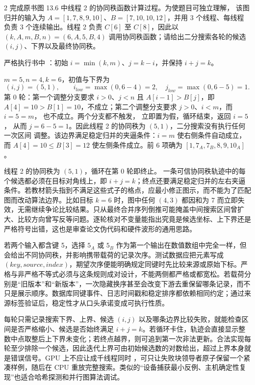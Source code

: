\begin{solutionexercise}{2}
\problemheading 完成原书图 13.6 中线程 2 的协同秩函数计算过程。为使题目可独立理解，
该图归并的输入为 $A=[1,7,8,9,10]$、$B=[7,10,10,12]$，并用 3 个线程、每线程
负责 3 个连续输出。线程 2 负责 $C[6]$ 至 $C[8]$，因此以
$(k,A,m,B,n)=(6,A,5,B,4)$ 调用协同秩函数；请给出二分搜索各轮的候选
$(i,j)$、下界以及最终协同秩。

\approachheading 严格执行书中 ：初始
$i=\min(k,m)$、$j=k-i$，并保持 $i+j=k$。

\answerheading $m=5,n=4,k=6$，初值与下界为
\[
(i,j)=(5,1),\qquad i_{low}=\max(0,6-4)=2,\quad
j_{low}=\max(0,6-5)=1.
\]
第 0 轮：第一个调整分支要求 $i>0$、$j<n$ 且 $A[i-1]>B[j]$，即
$A[4]=10>B[1]=10$，不成立；第二个调整分支要求 $j>0$、$i<m$，而 $i=5=m$，
也不成立。两个分支都不触发， 立即置为假，循环结束，返回 $i=5$，
从而 $j=6-5=1$。因此线程 2 的协同秩为 $(5,1)$，二分搜索没有执行任何一次区间
调整。该边界满足稳定归并的夹逼条件：$i=m$ 使右侧条件自动成立，而
$A[4]=10\le B[3]=12$ 使左侧条件成立。前 6 项确为 $[1,7_A,7_B,8,9,10_A]$。

\conclusionheading 线程 2 的协同秩为 $\boxed{(5,1)}$，循环在第 0 轮即终止。
\discussionheading
{}一条可信协同秩轨迹中的每个候选都必须在目标对角线上，即 $i+j=k$；终点还要满足稳定归并的左右夹逼条件。若教材箭头指到不满足这些式子的格点，应最小修正图示，而不能为了匹配图而改动算法边界。比如目标 $k=6$ 时，图中任何 $(4,3)$ 都因和为 7 而立即失效，无需继续争论比较结果。只从最终合并序列倒推可能掩盖中间搜索区间曾扩大、比较方向曾写反等问题。逐轮核对不变量能指出究竟是候选坐标、上下界还是严格符号出错，这也是审查论文伪代码和硬件波形的通用思路。

若两个输入都含键 5，选择 $5_A$ 或 $5_B$ 作为第一个输出在数值数组中完全一样，但会给出不同协同秩，并影响携带载荷的记录次序。测试数据应把元素写成 $(key,source,index)$，期望次序便能明确规定同键时先比较来源或原始下标。严格与非严格不等式必须与这条规则成对设计，不能两侧都严格或都宽松。若载荷分别是“旧版本”和“新版本”，一次隐藏换序甚至会改变下游去重保留哪条记录，而不只是展示顺序。数据库同键事件、日志时间戳和稳定排序都依赖相同约定；通过来源标签验证后，稳定性才从口头承诺变成可执行性质。

每轮只需记录搜索下界、上界、候选 $(i,j)$ 以及哪条边界比较失败，就能检查区间是否严格缩小、候选是否始终满足 $i+j=k$。若循环卡住，轨迹会直接显示整数中点取整后上下界未变化；若终点越界，则可追到第一次非法更新。合法实现每轮至少排除一个候选，因此迭代上界可由初始候选数的对数给出，超过上界本身就是错误信号。GPU 上不应让成千线程同时 ，可只让失败块领导者原子保留一个紧凑样例，随后在 CPU 重放完整搜索。类似的“设备捕获最小反例、主机确定性复现”也适合哈希探测和并行图算法调试。


\end{solutionexercise}
